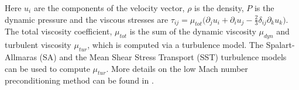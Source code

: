 Here $u_i$ are the components of the velocity vector, $\rho$ is the density, $P$ is the dynamic pressure and the viscous stresses are $\tau_{ij}=\mu_{tot}\big(\partial_j u_i + \partial_i u_j -\frac{2}{3} \delta_{ij}\partial_k u_k \big)$. The total viscosity coefficient, $\mu_{tot}$ is the sum of the dynamic viscosity $\mu_{dyn}$ and turbulent viscosity $\mu_{tur}$, which is computed via a turbulence model. The Spalart-Allmaras (SA)\cite{spalart1992one} and the Mean Shear Stress Transport (SST)\cite{wilcox1998turbulence} turbulence models can be used to compute $\mu_{tur}$. More details on the low Mach number preconditioning method can be found in \cite{SU2incomp2019}.



